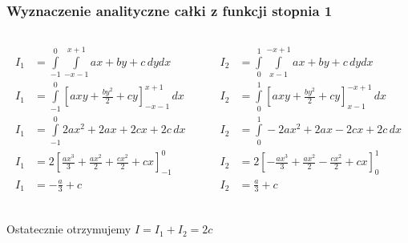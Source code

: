 \documentclass[9pt]{beamer}
\begin{document}
    \begin{frame}
        \frametitle{Wyznaczenie analityczne całki z funkcji stopnia 1}
        \begin{columns}
            \begin{column}{0.5\textwidth}
                \begin{align*}
                    I_1 &= \int\limits_{-1}^{0}\int\limits_{-x-1}^{x+1} ax+by+c \,dydx \\
                    I_1 &= \int\limits_{-1}^{0}\left[axy + \frac{by^2}{2} + cy\right]_{-x-1}^{x+1} \,dx \\
                    I_1 &= \int\limits_{-1}^{0} 2ax^2 + 2ax + 2cx + 2c \,dx \\
                    I_1 &= 2\left[ \frac{ax^3}{3} + \frac{ax^2}{2} + \frac{cx^2}{2} + cx \right]_{-1}^{0} \\
                    I_1 &= -\frac{a}{3} + c \\
                \end{align*}
            \end{column}
            \begin{column}{0.5\textwidth}
                \begin{align*}
                    I_2 &= \int\limits_{0}^{1}\int\limits_{x-1}^{-x+1} ax+by+c \,dydx \\
                    I_2 &= \int\limits_{0}^{1}\left[axy + \frac{by^2}{2} + cy\right]_{x-1}^{-x+1} \,dx \\
                    I_2 &= \int\limits_{0}^{1} - 2ax^2 + 2ax - 2cx + 2c \,dx \\
                    I_2 &= 2\left[ -\frac{ax^3}{3} + \frac{ax^2}{2} - \frac{cx^2}{2} + cx \right]_{0}^{1} \\
                    I_2 &= \frac{a}{3} + c \\
                \end{align*}
            \end{column}
        \end{columns}

        \begin{center}
            Ostatecznie otrzymujemy $ I = I_1 + I_2 = 2c $
        \end{center}
    \end{frame}
\end{document}
